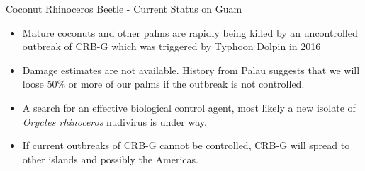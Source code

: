 \documentclass[]{beamer}
\begin{document}
\begin{frame}{Coconut Rhinoceros Beetle - Current Status on Guam}
	\begin{itemize}
		\item Mature coconuts and other palms are rapidly being killed by an uncontrolled outbreak of CRB-G which was triggered by Typhoon Dolpin in 2016
		\item Damage estimates are not available. History from Palau suggests that we will loose 50\% or more of our palms if the outbreak is not controlled.
		\item A search for an effective biological control agent, most likely a new isolate of \textit{Oryctes rhinoceros} nudivirus is under way.
		\item If current outbreaks of CRB-G cannot be controlled, CRB-G will spread to other islands and possibly the Americas.
	\end{itemize}
\end{frame}


%
%
\end{document}

